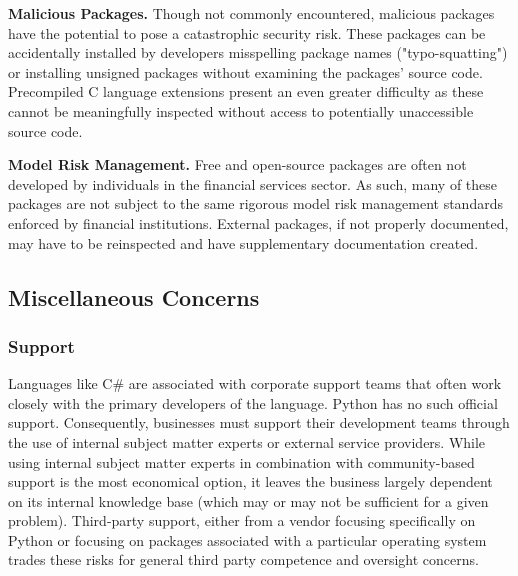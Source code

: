                 \textbf{Malicious Packages.}
                Though not commonly encountered, malicious packages have the potential to pose a catastrophic security risk. These packages can be accidentally installed by developers misspelling package names ("typo-squatting") or installing unsigned packages without examining the packages' source code. Precompiled C language extensions present an even greater difficulty as these cannot be meaningfully inspected without access to potentially unaccessible source code.

                \textbf{Model Risk Management.}
                Free and open-source packages are often not developed by individuals in the financial services sector. As such, many of these packages are not subject to the same rigorous model risk management standards enforced by financial institutions. External packages, if not properly documented, may have to be reinspected and have supplementary documentation created.

        \subsection{Miscellaneous Concerns}

            \subsubsection{Support}

                Languages like C\# are associated with corporate support teams that often work closely with the primary developers of the language. Python has no such official support. Consequently, businesses must support their development teams through the use of internal subject matter experts or external service providers. While using internal subject matter experts in combination with community-based support is the most economical option, it leaves the business largely dependent on its internal knowledge base (which may or may not be sufficient for a given problem). Third-party support, either from a vendor focusing specifically on Python or focusing on packages associated with a particular operating system trades these risks for general third party competence and oversight concerns.
